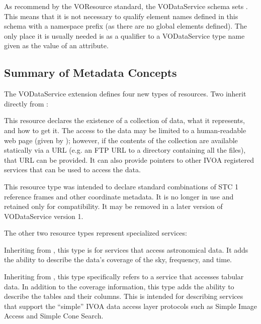 \documentclass[11pt,a4paper]{ivoa}
\begin{document}
As recommend by the VOResource standard, the
VODataService schema sets .
This means that it is not necessary to qualify element names defined
in this schema with a namespace prefix (as there are no global
elements defined).  The only place it is usually needed is as a
qualifier to a VODataService type name given as the value of an
 attribute.  


\subsection{Summary of Metadata Concepts}
\label{sect:summ}


The VODataService extension defines four new types of resources.  Two inherit
directly from :


\begin{bigdescription}
\item[\xmlel{vs:DataCollection}]
This resource declares the existence of a collection of data, what
       it represents, and how to get it.  The access to the data may be
       limited to a human-readable web page (given by
       ); however, if the
       contents of the collection are available statically via a
       URL (e.g. an FTP URL to a directory containing all the files),
       that URL can be provided.  It can also provide pointers to
       other IVOA registered services that can be used to access the data.

\item[\xmlel{vs:StandardSTC}]
This resource type was intended to declare standard combinations of
STC 1 reference frames and other coordinate metadata.  It is no longer
in use and retained only for compatibility.  It may be removed in a
later version of VODataService version 1.
\end{bigdescription}

The other two resource types represent specialized services:


\begin{bigdescription}
\item[\xmlel{vs:DataService}]
Inheriting from , this type is for
       services that access astronomical data.  It adds the ability to
       describe the data's coverage of the
       sky, frequency, and time.

\item[\xmlel{vs:CatalogService}]
Inheriting from , this type
       specifically refers to a service that accesses tabular data.
       In addition to the coverage information, this type adds the
       ability to describe the tables and their columns.  This is
       intended for describing services that support the ``simple'' IVOA
       data access layer protocols such as Simple Image Access
        and Simple Cone Search.
\end{bigdescription}
\end{document}
